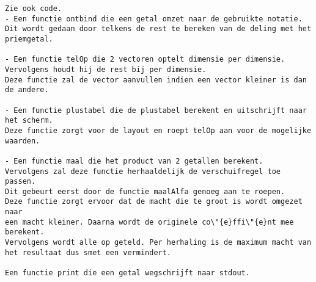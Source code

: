 \documentclass[11pt]{article}
\begin{document}
\begin{itemize}
\begin{Verbatim}[frame=single]
Zie ook code.
- Een functie ontbind die een getal omzet naar de gebruikte notatie.
Dit wordt gedaan door telkens de rest te bereken van de deling met het priemgetal.

- Een functie telOp die 2 vectoren optelt dimensie per dimensie.
Vervolgens houdt hij de rest bij per dimensie.
Deze functie zal de vector aanvullen indien een vector kleiner is dan de andere.

- Een functie plustabel die de plustabel berekent en uitschrijft naar het scherm.
Deze functie zorgt voor de layout en roept telOp aan voor de mogelijke waarden.

- Een functie maal die het product van 2 getallen berekent.
Vervolgens zal deze functie herhaaldelijk de verschuifregel toe passen.
Dit gebeurt eerst door de functie maalAlfa genoeg aan te roepen.
Deze functie zorgt ervoor dat de macht die te groot is wordt omgezet naar 
een macht kleiner. Daarna wordt de originele co\"{e}ffi\"{e}nt mee berekent.
Vervolgens wordt alle op geteld. Per herhaling is de maximum macht van
het resultaat dus smet een vermindert.

Een functie print die een getal wegschrijft naar stdout.

\end{Verbatim}

\end{itemize}
%
\end{document}
